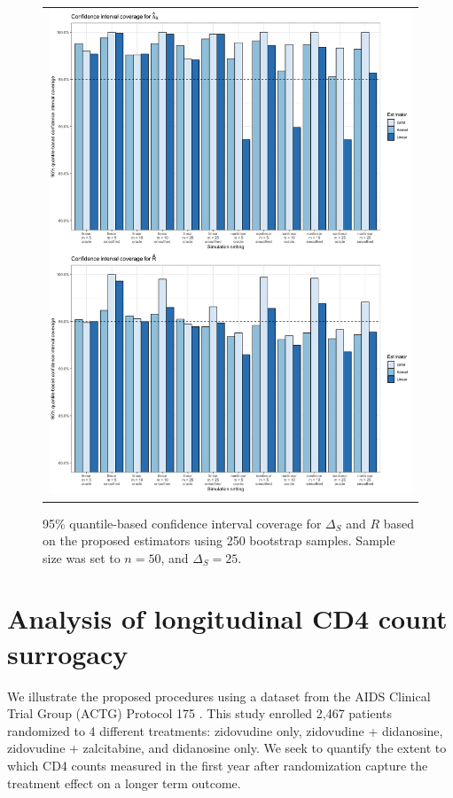 \documentclass[useAMS,usenatbib,referee]{biom}
\begin{document}
\begin{figure}
\centering
\begin{tabular}{c}
\includegraphics[width =\textwidth]{results/quantile-ci-figure.png}
\end{tabular}\vspace{0.2in}
\caption{95\% quantile-based confidence interval coverage for $\Delta_S$ and $R$ based on the proposed estimators using 250 bootstrap samples. Sample size was set to $n = 50$, and $\Delta_S = 25$.}\label{fig:ci}
\end{figure}


\section{Analysis of longitudinal CD4 count
surrogacy}\label{analysis-of-longitudinal-cd4-count-surrogacy}

We illustrate the proposed procedures using a dataset from the AIDS Clinical Trial Group (ACTG) Protocol 175 \citep{Hammer96}. This study enrolled 2,467 patients randomized to 4 different treatments: zidovudine only, zidovudine + didanosine, zidovudine + zalcitabine, and didanosine only. We seek to quantify the extent to which CD4 counts measured in the first year after randomization capture the treatment effect on a longer term outcome.
\end{document}
